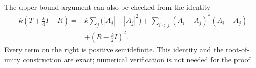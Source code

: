 \begin{remark}
The upper-bound argument can also be checked from the identity
\begin{align*}
 k\left(T+\frac{k}{4}I-R\right)
 ={}&k\sum_j\bigl(|A_j|-|A_j|^2\bigr)
   +\sum_{i<j}(A_i-A_j)^*(A_i-A_j)\\
 &+\left(R-\frac{k}{2}I\right)^2.
\end{align*}
Every term on the right is positive semidefinite. This identity and the root-of-unity construction are exact; numerical verification is not needed for the proof.
\end{remark}
